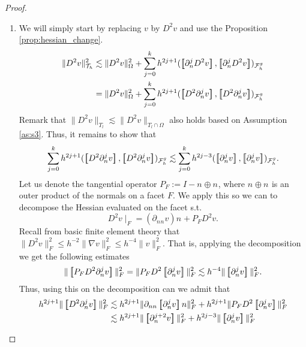 \begin{proof}
\begin{enumerate}[label=\arabic*)]
    \item We will simply start by replacing $v$  by $D^2 v$ and use the Proposition \ref{prop:hessian_change}.
        \[
            \begin{split}
                    \| D^2 v \|_{ \mathcal{T} _{h} }^{2  }&  \lesssim \| D^2 v \|_{ \Omega  }^{ 2 }  + \sum_{j=0}^{k} h^{2j+1} ( \jump{   \partial ^{j}_{n} D^2 v }, \jump{  \partial ^{j}_{n} D^2 v}    )_{\mathcal{F}_{h}^{g}} \\
                    &=  \| D^2 v \|_{ \Omega  }^{ 2 }  + \sum_{j=0}^{k} h^{2j+1} ( \jump{   D^2 \partial ^{j}_{n}  v }, \jump{  D^2 \partial ^{j}_{n}  v}    )_{\mathcal{F}_{h}^{g}}
            \end{split}
        \]
        Remark that $\|  D^2 v \|_{ T_{l} }^{  } \lesssim  \|  D^2 v \|_{ T_{l} \cap \Omega  }^{  }  $ also holds based on Assumption \ref{as:s3}.
        Thus, it remains to show that \[
        \sum_{j=0}^{k} h^{2j+1} ( \jump{   D^2 \partial ^{j}_{n}  v }, \jump{  D^2 \partial ^{j}_{n}  v}    )_{\mathcal{F}_{h}^{g}} \lesssim  \sum_{j=0}^{k} h^{2j-3} ( \jump{    \partial ^{j}_{n}  v }, \jump{  \partial ^{j}_{n}  v}
        )_{\mathcal{F}_{h}^{g}}.
        \]
        Let us denote the tangential operator $P_{F} := I - n_{} \oplus n_{} $, where $n_{}\oplus n_{}$ is an outer product of the normals on a facet $F$. We apply this so we can to decompose the Hessian evaluated on the facet  s.t. \[
        D^2 v  \mid _{F} = ( \partial _{n_{}n_{}}v)n_{} + P_{F} D^2 v .
        \]
        Recall from basic finite element theory that $\| D^2v \|_{F  }^{ 2 }\le h^{-2} \| \nabla v \|_{ F }^{ 2 } \le h^{-4} \| v \|_{ F }^{2  }    $.
        That is, applying the decomposition we get the following estimates \[
        \| \jump{ P_{F}   D^2 \partial _{n}^{j} v }\|_{ F }^{ 2 } = \| P_{F} D^2 \jump{ \partial _{n}^{j} v }   \|_{ F  }^{ 2} \lesssim h^{-4} \|  \jump{ \partial ^{j}_{n} v }   \|_{ F }^{  2}.
        \]
        Thus, using this on the decomposition can we admit that
         \[
             \begin{split}
            h^{2j +1} \| \jump{D^2 \partial ^{j}_{n}  v}  \|_{ F }^{2  } & \lesssim h^{2j +1} \|  \partial _{nn}  \jump{ \partial ^{j}_{n}  v }     n  \|_{ F }^{2  } + h^{2j +1} \| P_{F} D^2 \jump{ \partial ^{j}_{n}  v }       \|_{ F }^{2  } \\
            & \lesssim  h^{2j +1 } \|  \jump{ \partial ^{j+2}_{n} v }      \|_{F  }^{ 2 } + h^{2j -3}  \| \jump{ \partial ^{j}_{n}v }   \|_{ F }^{ 2 }
             \end{split}
        \]


\end{enumerate}
\end{proof}
